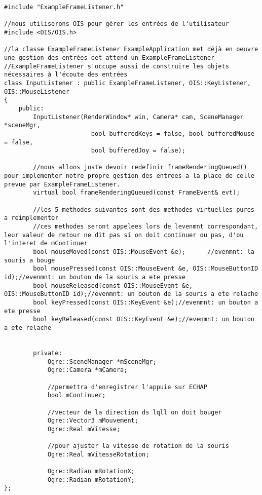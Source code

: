 \begin{lstlisting}[caption={InputListener.h}]
#include "ExampleFrameListener.h"

//nous utiliserons OIS pour gérer les entrées de l'utilisateur
#include <OIS/OIS.h>

//la classe ExampleFrameListener ExampleApplication met déjà en oeuvre une gestion des entrées eet attend un ExampleFrameListener
//ExampleFrameListener s'occupe aussi de construire les objets nécessaires à l'écoute des entrées
class InputListener : public ExampleFrameListener, OIS::KeyListener, OIS::MouseListener
{
    public:
        InputListener(RenderWindow* win, Camera* cam, SceneManager *sceneMgr, 
                        bool bufferedKeys = false, bool bufferedMouse = false, 
                        bool bufferedJoy = false);
        
        //nous allons juste devoir redefinir frameRenderingQueued() pour implementer notre propre gestion des entrees a la place de celle prevue par ExampleFrameListener.
        virtual bool frameRenderingQueued(const FrameEvent& evt);
        
        //les 5 methodes suivantes sont des methodes virtuelles pures a reimplementer
        //ces methodes seront appelees lors de levenmnt correspondant, leur valeur de retour ne dit pas si on doit continuer ou pas, d'ou l'interet de mContinuer
        bool mouseMoved(const OIS::MouseEvent &e);      //evenmnt: la souris a bouge
        bool mousePressed(const OIS::MouseEvent &e, OIS::MouseButtonID id);//evenmnt: un bouton de la souris a ete presse
        bool mouseReleased(const OIS::MouseEvent &e, OIS::MouseButtonID id);//evenmnt: un bouton de la souris a ete relache 
        bool keyPressed(const OIS::KeyEvent &e);//evenmnt: un bouton a ete presse 
        bool keyReleased(const OIS::KeyEvent &e);//evenmnt: un bouton a ete relache 
        

        private:
            Ogre::SceneManager *mSceneMgr;
            Ogre::Camera *mCamera;
            
            //permettra d'enregistrer l'appuie sur ECHAP
            bool mContinuer;

            //vecteur de la direction ds lqll on doit bouger
            Ogre::Vector3 mMouvement;
            Ogre::Real mVitesse;
            
            //pour ajuster la vitesse de rotation de la souris
            Ogre::Real mVitesseRotation;

            Ogre::Radian mRotationX;
            Ogre::Radian mRotationY;
};

\end{lstlisting}













